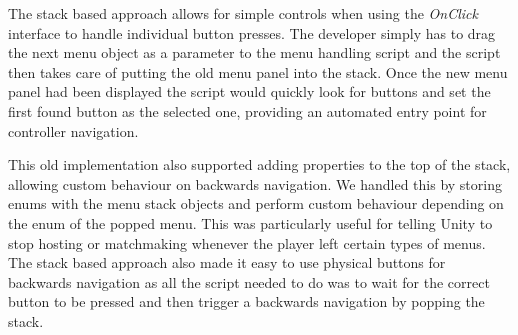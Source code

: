 The stack based approach allows for simple controls when using the \emph{OnClick} interface to handle individual button presses. The developer simply has to drag the next menu object as a parameter to the menu handling script and the script then takes care of putting the old menu panel into the stack. Once the new menu panel had been displayed the script would quickly look for buttons and set the first found button as the selected one, providing an automated entry point for controller navigation. 

This old implementation also supported adding properties to the top of the stack, allowing custom behaviour on backwards navigation. We handled this by storing enums with the menu stack objects and perform custom behaviour depending on the enum of the popped menu. This was particularly useful for telling Unity to stop hosting or matchmaking whenever the player left certain types of menus. 
The stack based approach also made it easy to use physical buttons for backwards navigation as all the script needed to do was to wait for the correct button to be pressed and then trigger a backwards navigation by popping the stack. 